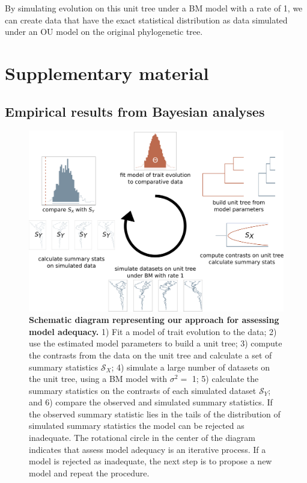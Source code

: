 \documentclass[a4paper,12pt]{article}
\begin{document}
By simulating evolution on this unit tree under a BM model with a rate of 1, we can create data that have the exact statistical distribution as data simulated under an OU model on the original phylogenetic tree.


\newpage
\section{Supplementary material}
\subsection{Empirical results from Bayesian analyses}


\newpage



\begin{figure}[p]
  \centering
  \includegraphics[scale=0.28]{figs/flowchart}
  \caption{\textbf{Schematic diagram representing our approach for assessing model adequacy.} 1) Fit a model of trait evolution to the data; 2) use the estimated model parameters to build a unit tree; 3) compute the contrasts from the data on the unit tree and calculate a set of summary statistics $\mathcal{S}_X$; 4) simulate a large number of datasets on the unit tree, using a BM model with $\sigma^2=$ 1; 5) calculate the summary statistics on the contrasts of each simulated dataset $\mathcal{S}_Y$; and 6) compare the observed and simulated summary statistics. If the observed summary statistic lies in the tails of the distribution of simulated summary statistics the model can be rejected as inadequate. The rotational circle in the center of the diagram indicates that assess model adequacy is an iterative process. If a model is rejected as inadequate, the next step is to propose a new model and repeat the procedure.}
  \label{fig:flowchart}
\end{figure}
\end{document}
